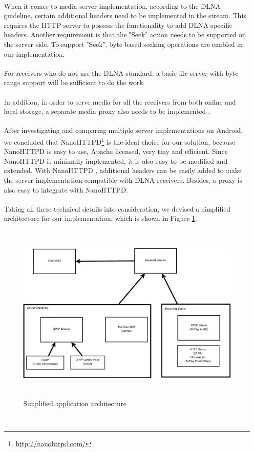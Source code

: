 \\
When it comes to media server implementation, according to the DLNA guideline,
certain additional headers need to be implemented in the stream. This
requires the HTTP server to possess the functionality to add DLNA specific
headers. Another requirement is that the "Seek" action needs to be supported on the server side. To support "Seek", byte based seeking operations are enabled in our implementation.\\
\\
For receivers who do not use the DLNA standard, a basic file server with byte
range support will be sufficient to do the work.\\
\\
In addition, in order to serve media for all the receivers from both online and
local storage, a separate media proxy also needs to be implemented
\cite{ipv6} \cite{DLNA_proxy2}.\\
\\
After investigating and comparing multiple server implementations on Android, we
concluded that NanoHTTPD\footnote{\url{http://nanohttpd.com/}} is the ideal
choice for our solution, because NanoHTTPD is easy to use, Apache licensed,
very tiny and efficient. Since NanoHTTPD is minimally implemented, it is also
easy to be modified and extended. With NanoHTTPD , additional headers can be
easily added to make the server implementation compatible with DLNA receivers.
Besides, a proxy is also easy to integrate with  NanoHTTPD.\\
\\
Taking all these technical details into consideration, we devised a simplified
architecture for our implementation, which is shown in Figure \ref{chart3}.
\begin{figure}[htb]
\centering \includegraphics[height=9cm]{charts/chart3}
\caption{Simplified application architecture\label{chart3}}
\end{figure}\\
